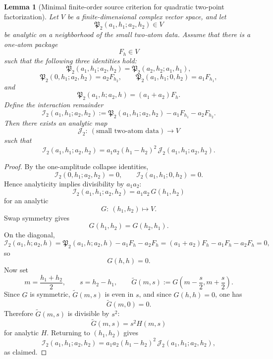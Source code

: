 \documentclass[11pt,a4paper]{amsart}
\theoremstyle{plain}
\newtheorem{lemma}[theorem]{Lemma}
\theoremstyle{definition}
\begin{document}
\begin{lemma}[Minimal finite-order source criterion for quadratic two-point factorization]
\label{lem:minimal-source-level-two-point-criterion}
Let $V$ be a finite-dimensional complex vector space, and let
\[
\mathfrak P_2(a_1,h_1;a_2,h_2)\in V
\]
be analytic on a neighborhood of the small two-atom data. Assume that there is
a one-atom package
\[
F_h\in V
\]
such that the following three identities hold:
\[
\mathfrak P_2(a_1,h_1;a_2,h_2)
=
\mathfrak P_2(a_2,h_2;a_1,h_1),
\]
\[
\mathfrak P_2(0,h_1;a_2,h_2)=a_2F_{h_2},
\qquad
\mathfrak P_2(a_1,h_1;0,h_2)=a_1F_{h_1},
\]
and
\[
\mathfrak P_2(a_1,h;a_2,h)=(a_1+a_2)F_h.
\]
Define the interaction remainder
\[
\mathcal I_2(a_1,h_1;a_2,h_2)
:=
\mathfrak P_2(a_1,h_1;a_2,h_2)-a_1F_{h_1}-a_2F_{h_2}.
\]
Then there exists an analytic map
\[
\mathcal J_2:\ (\text{small two-atom data})\to V
\]
such that
\[
\boxed{
\mathcal I_2(a_1,h_1;a_2,h_2)
=
a_1a_2(h_1-h_2)^2\,\mathcal J_2(a_1,h_1;a_2,h_2).
}
\]
\end{lemma}

\begin{proof}
By the one-amplitude collapse identities,
\[
\mathcal I_2(0,h_1;a_2,h_2)=0,
\qquad
\mathcal I_2(a_1,h_1;0,h_2)=0.
\]
Hence analyticity implies divisibility by $a_1a_2$:
\[
\mathcal I_2(a_1,h_1;a_2,h_2)=a_1a_2\,G(h_1,h_2)
\]
for an analytic
\[
G:\ (h_1,h_2)\longmapsto V.
\]
Swap symmetry gives
\[
G(h_1,h_2)=G(h_2,h_1).
\]
On the diagonal,
\[
\mathcal I_2(a_1,h;a_2,h)
=
\mathfrak P_2(a_1,h;a_2,h)-a_1F_h-a_2F_h
=
(a_1+a_2)F_h-a_1F_h-a_2F_h
=
0,
\]
so
\[
G(h,h)=0.
\]
Now set
\[
m=\frac{h_1+h_2}{2},
\qquad
s=h_2-h_1,
\qquad
\widetilde G(m,s):=
G\!\left(m-\frac{s}{2},m+\frac{s}{2}\right).
\]
Since $G$ is symmetric, $\widetilde G(m,s)$ is even in $s$, and since
$G(h,h)=0$, one has
\[
\widetilde G(m,0)=0.
\]
Therefore $\widetilde G(m,s)$ is divisible by $s^2$:
\[
\widetilde G(m,s)=s^2H(m,s)
\]
for analytic $H$. Returning to $(h_1,h_2)$ gives
\[
\mathcal I_2(a_1,h_1;a_2,h_2)
=
a_1a_2(h_1-h_2)^2\,\mathcal J_2(a_1,h_1;a_2,h_2),
\]
as claimed.
\end{proof}
\end{document}

